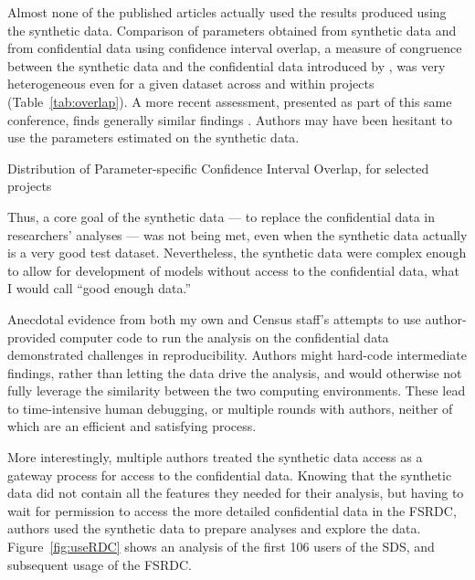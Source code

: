 \documentclass[12pt]{article}
\begin{document}
Almost none of the published articles actually used the results produced using the synthetic data. Comparison of parameters obtained from synthetic data and from confidential data using confidence interval overlap, a measure of congruence between the synthetic data and the confidential data introduced by \citet{tas2006}, was very heterogeneous even for a given dataset across and within projects (Table~\ref{tab:overlap}). A more recent assessment, presented as part of this same conference, finds generally similar findings \citep{carr-nber-2023,totty-nber-2023}. Authors may have  been  hesitant to use the parameters estimated on the synthetic data. 


\begin{table}[]
    \centering
    
    \caption{Distribution of Parameter-specific Confidence Interval Overlap, for selected projects}
    \label{tab:overlap}
\end{table}

Thus, a core goal of the synthetic data --- to replace the confidential data in researchers' analyses --- was not being met, even when the synthetic data actually is a very good test dataset. Nevertheless, the synthetic data were complex enough to allow for development of models without access to the confidential data, what I would call ``good enough data.''

Anecdotal evidence from both my own and Census staff's attempts to use author-provided computer code to run the analysis on the confidential data demonstrated challenges in reproducibility. Authors might hard-code intermediate findings, rather than letting the data drive the analysis, and would otherwise not fully leverage the similarity between the two computing environments. These lead to time-intensive human debugging, or multiple rounds with authors, neither of which are an efficient and satisfying process. 

More interestingly, multiple authors treated the synthetic data access as a gateway process for access to the confidential data. Knowing that the synthetic data did not contain all the features they needed for their analysis, but having to wait for permission to access the more detailed confidential data in the \ac{FSRDC}, authors used the synthetic data to prepare analyses and explore the data. Figure~\ref{fig:useRDC} shows an  analysis of the first 106 users of the SDS, and subsequent usage of the \ac{FSRDC}. 
\end{document}
